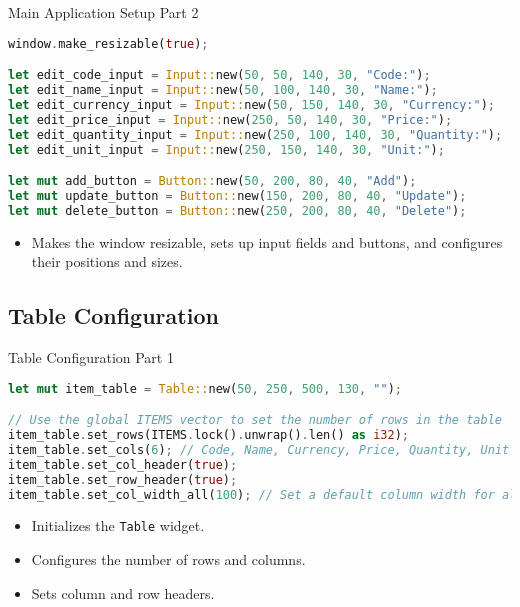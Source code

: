 \documentclass[aspectratio=169, table]{beamer}
\begin{document}
\begin{frame}[fragile]{Main Application Setup Part 2}
\vspace{15pt}
\begin{lstlisting}[language=Rust]
window.make_resizable(true);

let edit_code_input = Input::new(50, 50, 140, 30, "Code:");
let edit_name_input = Input::new(50, 100, 140, 30, "Name:");
let edit_currency_input = Input::new(50, 150, 140, 30, "Currency:");
let edit_price_input = Input::new(250, 50, 140, 30, "Price:");
let edit_quantity_input = Input::new(250, 100, 140, 30, "Quantity:");
let edit_unit_input = Input::new(250, 150, 140, 30, "Unit:");

let mut add_button = Button::new(50, 200, 80, 40, "Add");
let mut update_button = Button::new(150, 200, 80, 40, "Update");
let mut delete_button = Button::new(250, 200, 80, 40, "Delete");
\end{lstlisting}

\begin{itemize}
\item Makes the window resizable, sets up input fields and buttons, and configures their positions and sizes.
\end{itemize}
\end{frame}

\subsection{Table Configuration}
\begin{frame}[fragile]{Table Configuration Part 1}
\begin{lstlisting}[language=Rust]
let mut item_table = Table::new(50, 250, 500, 130, "");

// Use the global ITEMS vector to set the number of rows in the table
item_table.set_rows(ITEMS.lock().unwrap().len() as i32);
item_table.set_cols(6); // Code, Name, Currency, Price, Quantity, Unit
item_table.set_col_header(true);
item_table.set_row_header(true);
item_table.set_col_width_all(100); // Set a default column width for all columns
\end{lstlisting}

\begin{itemize}
\item Initializes the \texttt{Table} widget.
\item Configures the number of rows and columns.
\item Sets column and row headers.
\end{itemize}
\end{frame}
\end{document}
